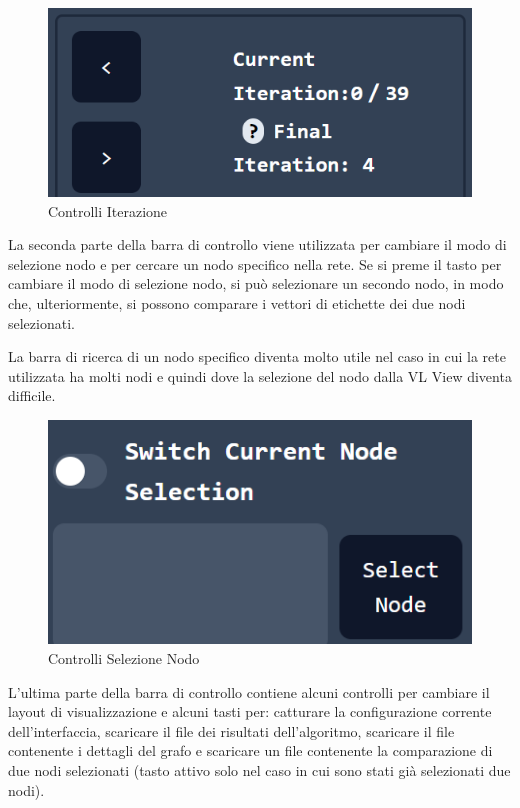 \documentclass[a4paper,12pt]{report}
\begin{document}
			\begin{center}
			\begin{figure}[H]
			\centering
			\includegraphics[width=0.8\linewidth,keepaspectratio]{iterationcontrol}
			\caption{Controlli Iterazione}
			\end{figure}
			\end{center}

			La seconda parte della barra di controllo viene utilizzata per cambiare il modo di selezione nodo e per cercare un nodo specifico nella rete. Se si preme il tasto per cambiare il modo di selezione nodo, si può selezionare un secondo nodo, in modo che, ulteriormente, si possono comparare i vettori di etichette dei due nodi selezionati. 
			
			La barra di ricerca di un nodo specifico diventa molto utile nel caso in cui la rete utilizzata ha molti nodi e quindi dove la selezione del nodo dalla VL View diventa difficile. 
			
			\begin{center}
			\begin{figure}[H]
			\centering
			\includegraphics[width=0.8\linewidth,keepaspectratio]{nodeselection}
			\caption{Controlli Selezione Nodo}
			\end{figure}
			\end{center}

			L'ultima parte della barra di controllo contiene alcuni controlli per cambiare il layout di visualizzazione e alcuni tasti per: catturare la configurazione corrente dell'interfaccia, scaricare il file dei risultati dell'algoritmo, scaricare il file contenente i dettagli del grafo e scaricare un file contenente la comparazione di due nodi selezionati (tasto attivo solo nel caso in cui sono stati già selezionati due nodi). 
\end{document}
